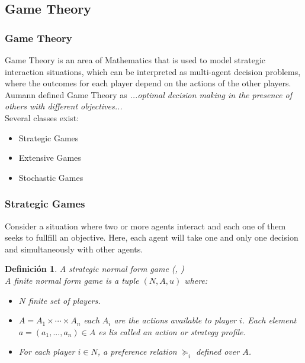 \documentclass{beamer}
\theoremstyle{plain}
\newtheorem{defi}[teo]{Definición}
\begin{document}
	\subsection{Game Theory}
\begin{frame}
\frametitle{Game Theory}
Game Theory is an area of Mathematics that is used to model strategic interaction situations, which can be interpreted as multi-agent decision problems, where the outcomes for each player depend on the actions of the other players.\\
Aumann defined Game Theory as \textit{...optimal decision making in the presence of others with different objectives...}\\
 Several classes exist:
\begin{itemize}
\item Strategic Games
\item Extensive Games
\item Stochastic Games
\end{itemize}
\end{frame}

\begin{frame}
\frametitle{Strategic Games}
Consider a situation where two or more agents interact and each one of them seeks to fullfill an objective. Here, each agent will take one and only one decision and simultaneously with other agents.
\begin{defi}{A strategic normal form game (\cite{osborne1994course}, \cite{shoham2008multiagent}) }\\
A finite normal form game is a tuple $(N,A,u)$ where:
\begin{itemize}
\item $N$ finite set of players.
\item $A= A_1 \times \cdots \times A_n$ each $A_i$ are the actions available to player $i$. Each element  $a = (a_1,...,a_n) \in A$ es lis called an action or strategy profile.
\item For each player $i \in N$, a preference relation $\succeq_i$ defined over $A$.
\end{itemize}
\end{defi}
\end{frame}
\end{document}
